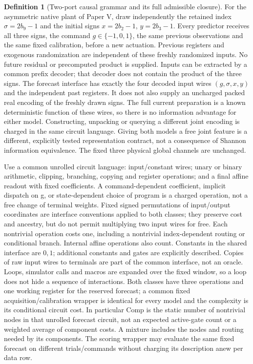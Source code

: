 \documentclass[11pt,a4paper]{article}
\theoremstyle{definition}
\newtheorem{definition}[theorem]{Definition}
\begin{document}
\begin{definition}[Two-port causal grammar and its full admissible closure]
\label{def:indexed-causal-grammar}
For the asymmetric native plant of Paper V, draw independently the retained
index $\sigma=2b_9-1$ and the initial signs $x=2b_2-1$, $y=2b_3-1$.
Every predictor receives all three signs, the command $g\in\{-1,0,1\}$,
the same previous observations and the same fixed calibration, before a new
actuation. Previous registers and exogenous randomization are independent of
these freshly randomized inputs. No future residual or precomputed product
is supplied. Inputs can be extracted by a common prefix decoder; that decoder
does not contain the product of the three signs.
The forecast interface has exactly the four decoded input wires
$(g,\sigma,x,y)$ and the independent past registers. It does not also supply
an uncharged packed real encoding of the freshly drawn signs. The full
current preparation is a known deterministic function of these wires, so
there is no information advantage for either model. Constructing, unpacking
or querying a different joint encoding is charged in the same circuit
language. Giving both models a free joint feature is a different, explicitly
tested representation contract, not a consequence of Shannon information
equivalence. The fixed three physical global channels are unchanged.

Use a common unrolled circuit language: input/constant wires; unary or binary
arithmetic, clipping, branching, copying and register operations; and a final
affine readout with fixed coefficients. A command-dependent coefficient,
implicit dispatch on g, or state-dependent choice of program is a charged
operation, not a free change of terminal weights. Fixed signed permutations
of input/output coordinates are interface conventions applied to both classes;
they preserve cost and ancestry, but do not permit multiplying two input wires
for free. Each nontrivial operation costs one, including a nontrivial
index-dependent routing or conditional branch. Internal affine operations
also count. Constants in the shared interface are $0,1$; additional constants
and gates are explicitly described. Copies of raw input wires to terminals
are part of the common interface, not an oracle. Loops, simulator calls and
macros are expanded over the fixed window, so a loop does not hide a sequence
of interactions. Both classes have three operations and one working register
for the reserved forecast; a common fixed acquisition/calibration wrapper is
identical for every model and the complexity is its conditional circuit cost.
In particular Comp is the static number of nontrivial nodes in that unrolled
forecast circuit, not an expected active-gate count or a weighted average
of component costs. A mixture includes the nodes and routing needed by its
components. The scoring wrapper may evaluate the same fixed forecast on
different trials/commands without charging its description anew per data row.


\end{definition}
\end{document}

